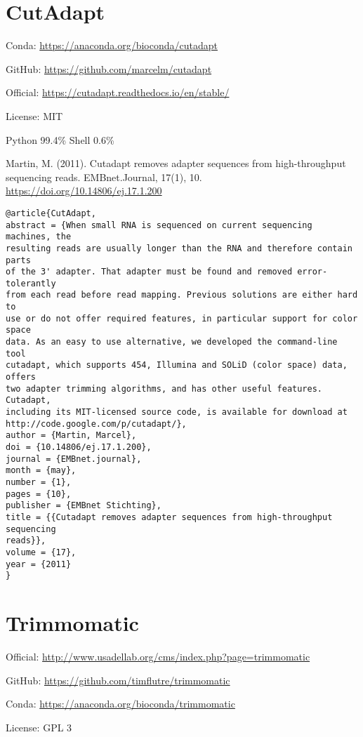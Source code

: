 \documentclass[]{article}
\begin{document}
\section{CutAdapt}

Conda: \url{https://anaconda.org/bioconda/cutadapt}

GitHub: \url{https://github.com/marcelm/cutadapt}

Official: \url{https://cutadapt.readthedocs.io/en/stable/}

License: MIT

Python 99.4\% Shell 0.6\%



Martin, M. (2011). Cutadapt removes adapter sequences from high-throughput sequencing reads. EMBnet.Journal, 17(1), 10. \url{https://doi.org/10.14806/ej.17.1.200}

\begin{verbatim}
@article{CutAdapt,
abstract = {When small RNA is sequenced on current sequencing machines, the
resulting reads are usually longer than the RNA and therefore contain parts
of the 3' adapter. That adapter must be found and removed error-tolerantly
from each read before read mapping. Previous solutions are either hard to
use or do not offer required features, in particular support for color space
data. As an easy to use alternative, we developed the command-line tool
cutadapt, which supports 454, Illumina and SOLiD (color space) data, offers
two adapter trimming algorithms, and has other useful features.   Cutadapt,
including its MIT-licensed source code, is available for download at
http://code.google.com/p/cutadapt/},
author = {Martin, Marcel},
doi = {10.14806/ej.17.1.200},
journal = {EMBnet.journal},
month = {may},
number = {1},
pages = {10},
publisher = {EMBnet Stichting},
title = {{Cutadapt removes adapter sequences from high-throughput sequencing
reads}},
volume = {17},
year = {2011}
}
\end{verbatim}

\section{Trimmomatic}

Official: \url{http://www.usadellab.org/cms/index.php?page=trimmomatic}

GitHub: \url{https://github.com/timflutre/trimmomatic}

Conda: \url{https://anaconda.org/bioconda/trimmomatic}

License: GPL 3
\end{document}

